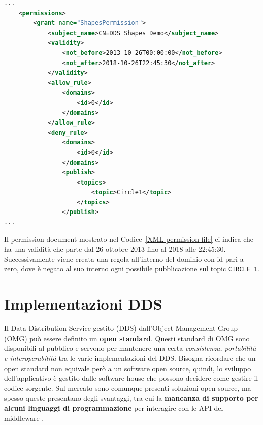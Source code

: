 \vspace{5mm} %
\begin{lstlisting}[language=XML, caption=Estratto di permissions
    document{,} tratto da documento di riferimento 
    del DDS Security versione 1.1 \cite{ddssecurity1.1}.
    , label=XML permission file,
    captionpos=b]
...
    <permissions>
        <grant name="ShapesPermission">
            <subject_name>CN=DDS Shapes Demo</subject_name>
            <validity>
                <not_before>2013-10-26T00:00:00</not_before>
                <not_after>2018-10-26T22:45:30</not_after>
            </validity>
            <allow_rule>
                <domains>
                    <id>0</id>
                </domains>
            </allow_rule>
            <deny_rule>
                <domains>
                    <id>0</id>
                </domains>
                <publish>
                    <topics>
                        <topic>Circle1</topic>
                    </topics>
                </publish>
...
    \end{lstlisting}
    \label{AccessControlServicePlugin}
\vspace{5mm}

Il permission document
mostrato nel Codice~\ref{XML permission file} 
ci indica che ha una validità che parte dal 26 ottobre 2013
fino al 2018 alle 22:45:30. Successivamente viene creata una 
regola all'interno del dominio con id pari a zero, dove è 
negato al suo interno ogni possibile pubblicazione sul topic
\texttt{CIRCLE 1}.


\section{Implementazioni DDS}
Il Data Distribution Service gestito (DDS) dall'Object Management
Group (OMG) può essere definito un \textbf{open standard}. Questi standard 
di OMG sono disponibili al pubblico e servono  
per mantenere una certa \textit{consistenza, portabilità e interoperabilità}
tra le varie implementazioni del DDS. Bisogna ricordare che un open 
standard non equivale però a un software open source, quindi, lo
sviluppo dell'applicativo è gestito dalle software house che possono 
decidere come gestire il codice sorgente. Sul mercato sono comunque 
presenti
soluzioni open source, ma spesso queste presentano degli svantaggi,
tra cui la \textbf{mancanza di supporto per alcuni linguaggi di programmazione} 
per interagire con le API del middleware
\cite{DDSimplementationRTI}.

